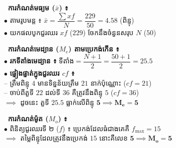 \documentclass[theme=teal]{khmermath}
\begin{document}
\begin{khcard}
 \vspace{-0.4cm}
  \begin{minipage}{0.535\textwidth}
    \begin{tcolorbox}[enhanced, frame hidden, borderline west={2.8pt}{0pt}{kmTealMain}, colback=kmTealBg, arc=2.5pt, left=6pt, right=5pt, top=3.2pt, bottom=3.2pt]
      \textbf{\color{kmTealMain}\fontsize{8.5}{8.5}\selectfont{}\ ការកំណត់មធ្យម ($\bar{x}$) ៖}\\[2pt]
      {\fontsize{7.5}{7.5}\selectfont\kby
      $\bullet$ តាមរូបមន្ត ៖ $\bar{x} = \dfrac{\sum xf}{N} = \dfrac{229}{50} = \mathbf{4.58}$ (ពិន្ទុ)\\[1.5pt]
      $\bullet$ យកផលបូកជួរឈរ $xf$ ($229$) ចែកនឹងចំនួនសរុប $N$ ($50$)
      }
    \end{tcolorbox}



    \begin{tcolorbox}[enhanced, frame hidden, borderline west={2.8pt}{0pt}{kmBlueMain}, colback=kmBlueBg, arc=2.5pt, left=6pt, right=5pt, top=3.2pt, bottom=3.2pt]
      \textbf{\color{kmBlueMain}\fontsize{8.5}{8.5}\selectfont{}\ ការកំណត់មេដ្យាន ($M_e$) តាមប្រេកង់កើន ៖}\\[2pt]
      {\fontsize{7.5}{7.5}\selectfont\kby
      $\bullet$ \textbf{រកទីតាំងមេដ្យាន ៖} $\text{ទីតាំង} = \dfrac{N+1}{2} = \dfrac{50+1}{2} = \mathbf{25.5}$\\[1.5pt]
      $\bullet$ \textbf{ផ្ទៀងផ្ទាត់ក្នុងជួរឈរ $cf$ ៖}\\
      \quad -- ត្រឹមពិន្ទុ $4$ មានទិន្នន័យត្រឹម $21$ នាក់ប៉ុណ្ណោះ ($cf = 21$)\\
      \quad -- ចាប់ពីតួទី $22$ ដល់ទី $36$ គឺត្រូវនឹងពិន្ទុ $5$ ($cf = 36$)\\[1.5pt]
      $\implies$ ដូចនេះ តួទី $25.5$ ធ្លាក់លើពិន្ទុ $\mathbf{5} \implies \mathbf{M_e = 5}$
      }
    \end{tcolorbox}



    \begin{tcolorbox}[enhanced, frame hidden, borderline west={2.8pt}{0pt}{koreaOrange}, colback=brandGoldBg, arc=2.5pt, left=6pt, right=5pt, top=3.2pt, bottom=3.2pt]
      \textbf{\color{koreaOrange!90!black}\fontsize{8.5}{8.5}\selectfont{}\ ការកំណត់ម៉ូត ($M_o$) ៖}\\[2pt]
      {\fontsize{7.5}{7.5}\selectfont\kby
      $\bullet$ ពិនិត្យជួរឈរទី ២ ($f$) ៖ ប្រេកង់ដែលធំជាងគេគឺ $f_{\max} = 15$\\
      $\implies$ តម្លៃពិន្ទុដែលត្រូវនឹងប្រេកង់ $15$ នោះគឺលេខ $\mathbf{5} \implies \mathbf{M_o = 5}$
      }
    \end{tcolorbox}
  \end{minipage}
  \vspace{0.3cm}

 


 
\end{khcard}
\end{document}
